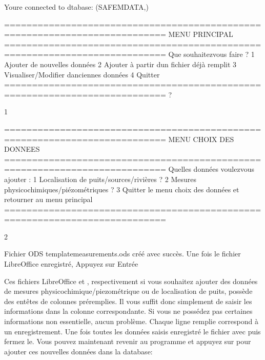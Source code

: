 \documentclass[letterpaper,10pt,french]{sphinxmanual}
\begin{document}
\begin{sphinxVerbatim}[commandchars=\\\{\}]
You\PYGZsq{}re connected to dtabase:  (\PYGZsq{}SAFEM\PYGZus{}DATA\PYGZsq{},)

===========================================================================
MENU PRINCIPAL
===========================================================================
Que souhaitez\PYGZhy{}vous faire ?
1 \PYGZhy{} Ajouter de nouvelles données
2 \PYGZhy{} Ajouter à partir d\PYGZsq{}un fichier déjà remplit
3 \PYGZhy{} Visualiser/Modifier d\PYGZsq{}anciennes données
4 \PYGZhy{} Quitter
===========================================================================
?

\PYGZhy{}\PYGZgt{} 1

    ===========================================================================
    MENU CHOIX DES DONNEES
    ===========================================================================
    Quelles données voulez\PYGZhy{}vous ajouter :
    1 \PYGZhy{} Localisation de puits/sources/rivières ?
    2 \PYGZhy{} Mesures physico\PYGZhy{}chimiques/piézométriques ?
    3 \PYGZhy{} Quitter le menu choix des données et retourner au menu principal
    ===========================================================================

\PYGZhy{}\PYGZgt{} 2

Fichier ODS \PYGZsq{}template\PYGZus{}measurements.ods\PYGZsq{} créé avec succès.
Une fois le fichier LibreOffice enregistré, Appuyez sur Entrée
\end{sphinxVerbatim}

\noindent{}

\sphinxAtStartPar
Ces fichiers LibreOffice  et , respectivement si vous souhaitez ajouter des données
de mesures physico\sphinxhyphen{}chimique/piezométrique ou de localisation de puits, possède des entêtes de colonnes pré\sphinxhyphen{}remplies. Il vous suffit donc simplement
de saisir les informations dans la colonne correspondante. Si vous ne possédez pas certaines informations non essentielle, aucun problème. Chaque
ligne remplie correspond à un enregistrement. Une fois toutes les données saisis enregistré le fichier avec  puis fermez le. Vous
pouvez maintenant revenir au programme et appuyez sur  pour ajouter ces nouvelles données dans la database:
\end{document}

